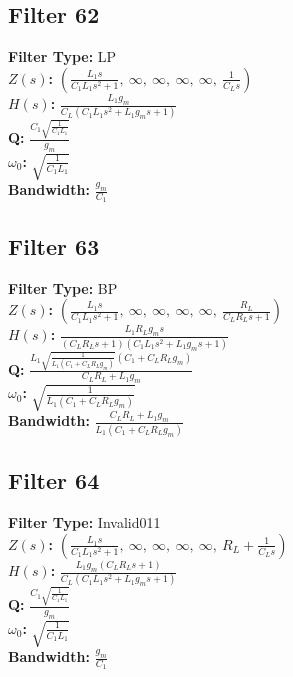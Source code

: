 \documentclass{article}
\begin{document}
\subsection*{Filter 62}
\textbf{Filter Type:} LP \\ 
\textbf{$Z(s)$:} $\left( \frac{L_{1} s}{C_{1} L_{1} s^{2} + 1}, \  \infty, \  \infty, \  \infty, \  \infty, \  \frac{1}{C_{L} s}\right)$ \\ 
\textbf{$H(s)$:} $\frac{L_{1} g_{m}}{C_{L} \left(C_{1} L_{1} s^{2} + L_{1} g_{m} s + 1\right)}$ \\ 
\textbf{Q:} $\frac{C_{1} \sqrt{\frac{1}{C_{1} L_{1}}}}{g_{m}}$ \\ 
\textbf{$\omega_0$:} $\sqrt{\frac{1}{C_{1} L_{1}}}$ \\ 
\textbf{Bandwidth:} $\frac{g_{m}}{C_{1}}$ \\ 
\subsection*{Filter 63}
\textbf{Filter Type:} BP \\ 
\textbf{$Z(s)$:} $\left( \frac{L_{1} s}{C_{1} L_{1} s^{2} + 1}, \  \infty, \  \infty, \  \infty, \  \infty, \  \frac{R_{L}}{C_{L} R_{L} s + 1}\right)$ \\ 
\textbf{$H(s)$:} $\frac{L_{1} R_{L} g_{m} s}{\left(C_{L} R_{L} s + 1\right) \left(C_{1} L_{1} s^{2} + L_{1} g_{m} s + 1\right)}$ \\ 
\textbf{Q:} $\frac{L_{1} \sqrt{\frac{1}{L_{1} \left(C_{1} + C_{L} R_{L} g_{m}\right)}} \left(C_{1} + C_{L} R_{L} g_{m}\right)}{C_{L} R_{L} + L_{1} g_{m}}$ \\ 
\textbf{$\omega_0$:} $\sqrt{\frac{1}{L_{1} \left(C_{1} + C_{L} R_{L} g_{m}\right)}}$ \\ 
\textbf{Bandwidth:} $\frac{C_{L} R_{L} + L_{1} g_{m}}{L_{1} \left(C_{1} + C_{L} R_{L} g_{m}\right)}$ \\ 
\subsection*{Filter 64}
\textbf{Filter Type:} Invalid011 \\ 
\textbf{$Z(s)$:} $\left( \frac{L_{1} s}{C_{1} L_{1} s^{2} + 1}, \  \infty, \  \infty, \  \infty, \  \infty, \  R_{L} + \frac{1}{C_{L} s}\right)$ \\ 
\textbf{$H(s)$:} $\frac{L_{1} g_{m} \left(C_{L} R_{L} s + 1\right)}{C_{L} \left(C_{1} L_{1} s^{2} + L_{1} g_{m} s + 1\right)}$ \\ 
\textbf{Q:} $\frac{C_{1} \sqrt{\frac{1}{C_{1} L_{1}}}}{g_{m}}$ \\ 
\textbf{$\omega_0$:} $\sqrt{\frac{1}{C_{1} L_{1}}}$ \\ 
\textbf{Bandwidth:} $\frac{g_{m}}{C_{1}}$ \\ 
\end{document}
